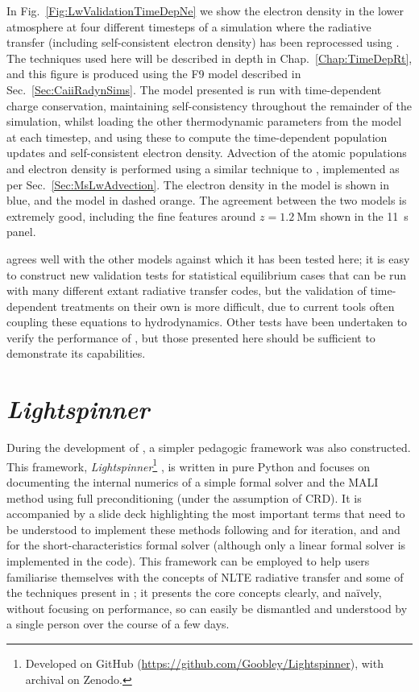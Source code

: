 In Fig.~\ref{Fig:LwValidationTimeDepNe} we show the electron density in the lower atmosphere at four different timesteps of a \Radyn{} simulation where the radiative transfer (including self-consistent electron density) has been reprocessed using \Lw{}.
The techniques used here will be described in depth in Chap.~\ref{Chap:TimeDepRt}, and this figure is produced using the F9 model described in Sec.~\ref{Sec:CaiiRadynSims}.
The \Lw{} model presented is run with time-dependent charge conservation, maintaining self-consistency throughout the remainder of the simulation, whilst loading the other thermodynamic parameters from the \Radyn{} model at each timestep, and using these to compute the time-dependent population updates and self-consistent electron density.
Advection of the atomic populations and electron density is performed using a similar technique to \Radyn{}, implemented as per Sec.~\ref{Sec:MsLwAdvection}.
The electron density in the \Radyn{} model is shown in blue, and the \Lw{} model in dashed orange.
The agreement between the two models is extremely good, including the fine features around $z=\SI{1.2}{\mega\metre}$ shown in the \SI{11}{\second} panel.

\Lw{} agrees well with the other models against which it has been tested here; it is easy to construct new validation tests for statistical equilibrium cases that can be run with many different extant radiative transfer codes, but the validation of time-dependent treatments on their own is more difficult, due to current tools often coupling these equations to hydrodynamics.
Other tests have been undertaken to verify the performance of \Lw{}, but those presented here should be sufficient to demonstrate its capabilities.


\section{\emph{Lightspinner}}

During the development of \Lw{}, a simpler pedagogic framework was also constructed.
This framework, \emph{Lightspinner}\footnote{Developed on GitHub (\url{https://github.com/Goobley/Lightspinner}), with archival on Zenodo.} \citep{Lightspinner}, is written in pure Python and focuses on documenting the internal numerics of a simple formal solver and the MALI method using full preconditioning (under the assumption of CRD).
It is accompanied by a slide deck highlighting the most important terms that need to be understood to implement these methods following \citet{Rybicki1992} and \citet{Uitenbroek2001} for iteration, and \citet{Olson1987} and \citet{Auer1994} for the short-characteristics formal solver (although only a linear formal solver is implemented in the code). This framework can be employed to help users familiarise themselves with the concepts of NLTE radiative transfer and some of the techniques present in \Lw{}; it presents the core concepts clearly, and naïvely, without focusing on performance, so can easily be dismantled and understood by a single person over the course of a few days.

